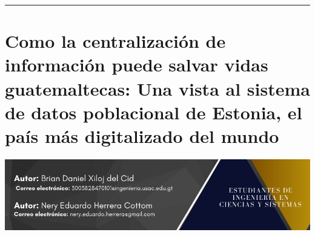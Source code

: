 \documentclass[12pt,spanish,Letterpaper,openany]{book}
\newcommand{\HRule}{\begin{center}\rule{0.5\linewidth}{0.2mm}\end{center}}
\begin{document}
\medskip

\HRule

\medskip

\hypertarget{pareja70}{%
\chapter{Como la centralización de información puede salvar vidas guatemaltecas: Una vista al sistema de datos poblacional de Estonia, el país más digitalizado del mundo}\label{pareja70}}

\begin{center}\includegraphics[width=1\linewidth]{images/pareja70_01} \end{center}
\end{document}

